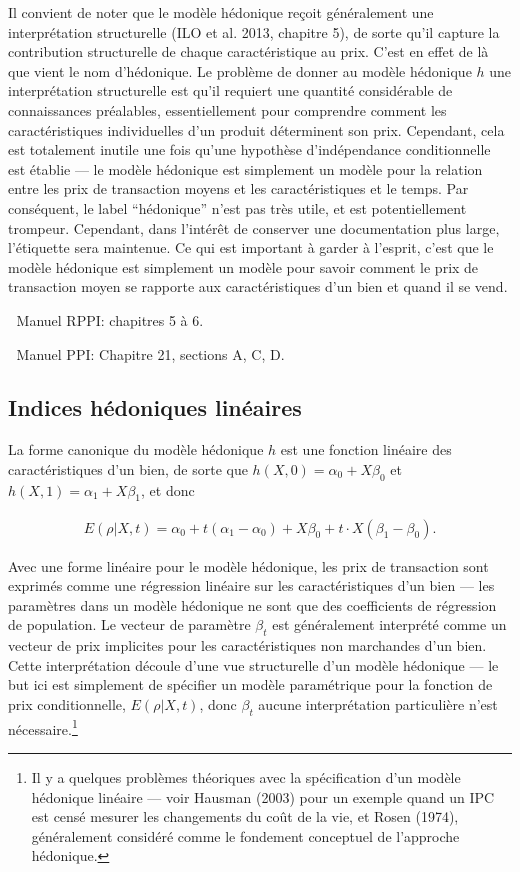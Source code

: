 \documentclass[
]{article}
\begin{document}
Il convient de noter que le modèle hédonique reçoit généralement une interprétation structurelle (ILO et al. 2013, chapitre 5), de sorte qu'il capture la contribution structurelle de chaque caractéristique au prix. C'est en effet de là que vient le nom d'hédonique. Le problème de donner au modèle hédonique \(h\) une interprétation structurelle est qu'il requiert une quantité considérable de connaissances préalables, essentiellement pour comprendre comment les caractéristiques individuelles d'un produit déterminent son prix. Cependant, cela est totalement inutile une fois qu'une hypothèse d'indépendance conditionnelle est établie --- le modèle hédonique est simplement un modèle pour la relation entre les prix de transaction moyens et les caractéristiques et le temps. Par conséquent, le label ``hédonique'' n'est pas très utile, et est potentiellement trompeur. Cependant, dans l'intérêt de conserver une documentation plus large, l'étiquette sera maintenue. Ce qui est important à garder à l'esprit, c'est que le modèle hédonique est simplement un modèle pour savoir comment le prix de transaction moyen se rapporte aux caractéristiques d'un bien et quand il se vend.

📖 Manuel RPPI: chapitres 5 à 6.

📖 Manuel PPI: Chapitre 21, sections A, C, D.

\hypertarget{indices-huxe9doniques-linuxe9aires}{%
\subsection{Indices hédoniques linéaires}\label{indices-huxe9doniques-linuxe9aires}}

La forme canonique du modèle hédonique \(h\) est une fonction linéaire des caractéristiques d'un bien, de sorte que \(h(X, 0) = \alpha_{0} + X \beta_{0}\) et \(h(X, 1) = \alpha_{1} + X \beta_{1}\), et donc

\begin{align*}
E(\rho | X, t) = \alpha_{0} + t (\alpha_{1} - \alpha_{0}) + X \beta_{0} + t \cdot X (\beta_{1} - \beta_{0}).
\end{align*}

Avec une forme linéaire pour le modèle hédonique, les prix de transaction sont exprimés comme une régression linéaire sur les caractéristiques d'un bien --- les paramètres dans un modèle hédonique ne sont que des coefficients de régression de population. Le vecteur de paramètre \(\beta_{t}\) est généralement interprété comme un vecteur de prix implicites pour les caractéristiques non marchandes d'un bien. Cette interprétation découle d'une vue structurelle d'un modèle hédonique --- le but ici est simplement de spécifier un modèle paramétrique pour la fonction de prix conditionnelle, \(E(\rho | X, t)\), donc \(\beta_{t}\) aucune interprétation particulière n'est nécessaire.\footnote{Il y a quelques problèmes théoriques avec la spécification d'un modèle hédonique linéaire --- voir Hausman (2003) pour un exemple quand un IPC est censé mesurer les changements du coût de la vie, et Rosen (1974), généralement considéré comme le fondement conceptuel de l'approche hédonique.}
\end{document}
